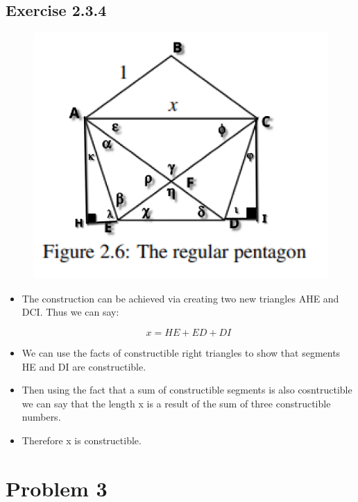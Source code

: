 \documentclass[]{report}
\begin{document}
\subsection{Exercise 2.3.4}


\begin{figure}[H]
	\centering
	\includegraphics[width=0.7\linewidth]{pics/p2}
\end{figure}

\begin{itemize}
\item The construction can be achieved via creating two new triangles AHE and DCI. Thus we can say:

$$ x  = HE + ED + DI $$

\item We can use the facts of constructible right triangles to show that segments HE and DI are constructible.  

\item Then using the fact that a sum of constructible segments is also cosntructible we can say that the length x is a  result of the sum of three constructible numbers.  

\item Therefore x is constructible.

\end{itemize}

\begin{flushright}
\smiley{}
\end{flushright}



\section{Problem 3}
\end{document}
